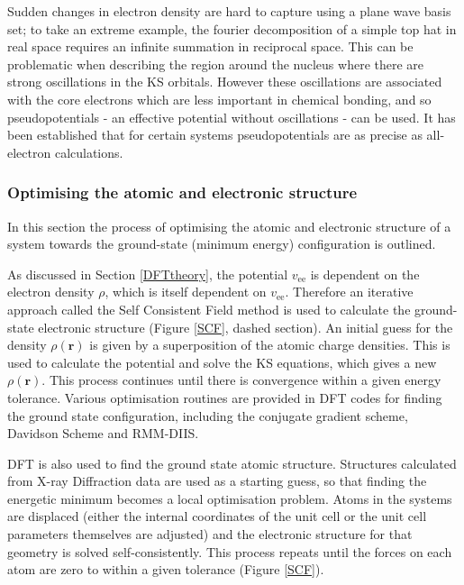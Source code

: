 Sudden changes in electron density are hard to capture using a plane wave basis set; to take an extreme example, the fourier decomposition of a simple top hat in real space requires an infinite summation in reciprocal space. This can be problematic when describing the region around the nucleus where there are strong oscillations in the KS orbitals. However these oscillations are associated with the core electrons which are less important in chemical bonding, and so pseudopotentials - an effective potential without oscillations - can be used. It has been established that for certain systems pseudopotentials are as precise as all-electron calculations.\autocite{Lejaeghere2016}

\subsubsection{Optimising the atomic and electronic structure}

In this section the process of optimising the atomic and electronic structure of a system towards the ground-state (minimum energy) configuration is outlined. 

As discussed in Section \ref{DFTtheory}, the potential $v_\textrm{ee}$ is dependent on the electron density $\rho$, which is itself dependent on $v_\textrm{ee}$. Therefore an iterative approach called the Self Consistent Field method is used to calculate the ground-state electronic structure (Figure \ref{SCF}, dashed section). An initial guess for the density $\rho(\textbf{r})$ is given by a superposition of the atomic charge densities. This is used to calculate the potential and solve the KS equations, which gives a new $\rho(\textbf{r})$. This process continues until there is convergence within a given energy tolerance. Various optimisation routines are provided in DFT codes for finding the ground state configuration, including the conjugate gradient scheme, Davidson Scheme and RMM-DIIS.

DFT is also used to find the ground state atomic structure. Structures calculated from X-ray Diffraction data are used as a starting guess, so that finding the energetic minimum becomes a local optimisation problem. Atoms in the systems are displaced (either the internal coordinates of the unit cell or the unit cell parameters themselves are adjusted) and the electronic structure for that geometry is solved self-consistently. This process repeats until the forces on each atom are zero to within a given tolerance (Figure \ref{SCF}). 

